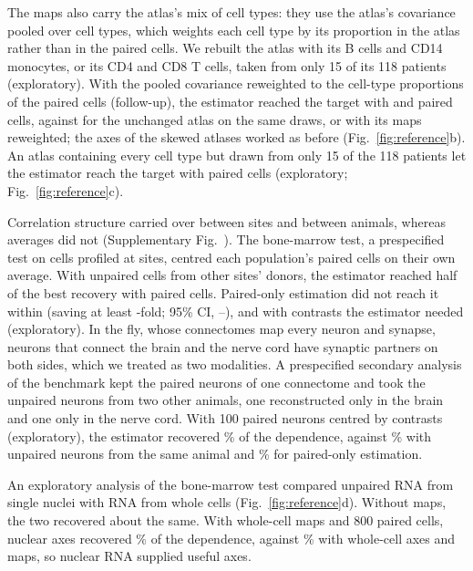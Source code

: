 \documentclass[pdflatex,sn-vancouver-num,iicol]{sn-jnl}
\begin{document}
The maps also carry the atlas's mix of cell types: they use the atlas's covariance pooled over cell types, which weights each cell type by its proportion in the atlas rather than in the paired cells. We rebuilt the atlas with its B cells and CD14 monocytes, or its CD4 and CD8 T cells, taken from only 15 of its 118 patients (exploratory). With the pooled covariance reweighted to the cell-type proportions of the paired cells (follow-up), the estimator reached the target with \RvFewBMonoRwCells{} and \RvFewTRwCells{} paired cells, against \RvBothCells{} for the unchanged atlas on the same draws, or \RvFullRwCells{} with its maps reweighted; the axes of the skewed atlases worked as before (Fig.~\ref{fig:reference}b). An atlas containing every cell type but drawn from only 15 of the 118 patients let the estimator reach the target with \RbCellsPatientsFifteen{} paired cells (exploratory; Fig.~\ref{fig:reference}c).

Correlation structure carried over between sites and between animals, whereas averages did not (Supplementary Fig.~). The bone-marrow test, a prespecified test on cells profiled at \DpNSites{} sites\cite{luecken2021sandbox}, centred each population's paired cells on their own average. With unpaired cells from other sites' donors, the estimator reached half of the best recovery with \DpCellsOther{} paired cells. Paired-only estimation did not reach it within \DpMaxBudget{} (saving at least \DpSaveOther-fold; 95\% CI, \DpSaveOtherLo--\DpSaveOtherHi), and with contrasts the estimator needed \CtCellsOther{} (exploratory). In the fly, whose connectomes map every neuron and synapse, neurons that connect the brain and the nerve cord have synaptic partners on both sides, which we treated as two modalities. A prespecified secondary analysis of the benchmark kept the paired neurons of one connectome\cite{bates2026} and took the unpaired neurons from two other animals, one reconstructed only in the brain\cite{dorkenwald2024,schlegel2024} and one only in the nerve cord\cite{takemura2024}. With 100 paired neurons centred by contrasts (exploratory), the estimator recovered \FxOwnHundred\% of the dependence, against \FxSameHundred\% with unpaired neurons from the same animal and \FxPairedOwnHundred\% for paired-only estimation.

An exploratory analysis of the bone-marrow test compared unpaired RNA from single nuclei with RNA from whole cells (Fig.~\ref{fig:reference}d). Without maps, the two recovered about the same. With whole-cell maps and 800 paired cells, nuclear axes recovered \MpAssayOtherMap\% of the dependence, against \MpOtherMapped\% with whole-cell axes and maps, so nuclear RNA supplied useful axes.
\end{document}
